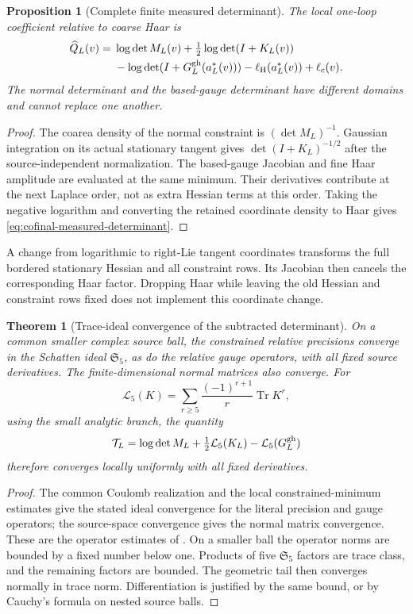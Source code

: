 \documentclass[11pt,oneside,openany]{book}
\newtheorem{theorem}{Theorem}[chapter]
\newtheorem{proposition}[proposition]{Proposition}
\theoremstyle{definition}
\theoremstyle{remark}
\newcommand{\Tr}{\operatorname{Tr}}
\newcommand{\src}[2]{\cite[#2]{#1}}
\begin{document}
\begin{proposition}[Complete finite measured determinant]
\label{prop:cofinal-measured-determinant}
The local one-loop coefficient relative to coarse Haar is
\begin{align}
 \widehat Q_L(v)={}&\log\det M_L(v)
               +\tfrac12\log\det(I+K_L(v))\notag\\
 &-\log\det(I+G_L^{\rm gh}(a_L^*(v)))
                  -\ell_{\rm H}(a_L^*(v))+\ell_c(v).
 \label{eq:cofinal-measured-determinant}
\end{align}
The normal determinant and the based-gauge determinant have different
domains and cannot replace one another.
\end{proposition}
\begin{proof}
The coarea density of the normal constraint is $(\det M_L)^{-1}$.
Gaussian integration on its actual stationary tangent gives
$\det(I+K_L)^{-1/2}$ after the source-independent normalization.
The based-gauge Jacobian and fine Haar amplitude are evaluated at the
same minimum. Their derivatives contribute at the next Laplace order,
not as extra Hessian terms at this order. Taking the negative logarithm
and converting the retained coordinate density to Haar gives
\cref{eq:cofinal-measured-determinant}.
\end{proof}

A change from logarithmic to right-Lie tangent coordinates transforms
the full bordered stationary Hessian and all constraint rows. Its
Jacobian then cancels the corresponding Haar factor. Dropping Haar
while leaving the old Hessian and constraint rows fixed does not
implement this coordinate change.

\begin{theorem}[Trace-ideal convergence of the subtracted determinant]
\label{thm:cofinal-trace-tail}
On a common smaller complex source ball, the constrained relative
precisions converge in the Schatten ideal $\mathfrak S_5$, as do the
relative gauge operators, with all fixed source derivatives. The
finite-dimensional normal matrices also converge. For
\[
 \mathcal L_5(K)=\sum_{r\ge5}\frac{(-1)^{r+1}}r\Tr K^r,
\]
using the small analytic branch, the quantity
\begin{equation}
 \mathcal T_L=\log\det M_L+\tfrac12\mathcal L_5(K_L)
                  -\mathcal L_5(G_L^{\rm gh})
 \label{eq:cofinal-tail}
\end{equation}
therefore converges locally uniformly with all fixed derivatives.
\end{theorem}
\begin{proof}
The common Coulomb realization and the local constrained-minimum
estimates give the stated ideal convergence for the literal precision
and gauge operators; the source-space convergence gives the normal
matrix convergence. These are the operator estimates of
\src{SM}{V15--V16}. On a smaller ball the operator norms are bounded by
a fixed number below one. Products of five $\mathfrak S_5$ factors are
trace class, and the remaining factors are bounded. The geometric tail
then converges normally in trace norm. Differentiation is justified by
the same bound, or by Cauchy's formula on nested source balls.
\end{proof}
\end{document}
